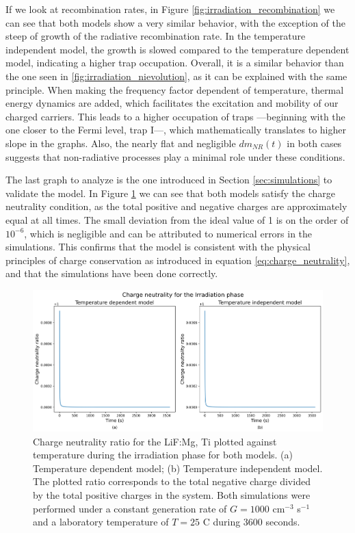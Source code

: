 If we look at recombination rates, in Figure \ref{fig:irradiation_recombination} we can see that both models show a very similar behavior, with the exception of the steep of growth of the radiative recombination rate. In the temperature independent model, the growth is slowed compared to the temperature dependent model, indicating a higher trap occupation. Overall, it is a similar behavior than the one seen in \ref{fig:irradiation_nievolution}, as it can be explained with the same principle. When making the frequency factor dependent of temperature, thermal energy dynamics are added, which facilitates the excitation and mobility of our charged carriers. This leads to a higher occupation of traps ---beginning with the one closer to the Fermi level, trap I---, which mathematically translates to higher slope in the graphs. 
Also, the nearly flat and negligible $dm_{NR}(t)$ in both cases suggests that non-radiative processes play a minimal role under these conditions. %

\vspace{10pt}

The last graph to analyze is the one introduced in Section \ref{sec:simulations} to validate the model. In Figure \ref{fig:irradiation_chneutrality} we can see that both models satisfy the charge neutrality condition, as the total positive and negative charges are approximately equal at all times. The small deviation from the ideal value of 1 is on the order of $10^{-6}$, which is negligible and can be attributed to numerical errors in the simulations. This confirms that the model is consistent with the physical principles of charge conservation as introduced in equation \ref{eq:charge_neutrality}, and that the simulations have been done correctly.

\begin{figure}
    \centering
    \includegraphics[width=\textwidth]{Images/Irradiation Charge neutrality.png}
    \caption{Charge neutrality ratio for the LiF:Mg, Ti plotted against temperature during the irradiation phase for both models. (a) Temperature dependent model; (b) Temperature independent model. The plotted ratio corresponds to the total negative charge divided by the total positive charges in the system. Both simulations were performed under a constant generation rate of $G = 1000$ cm$^{-3}$ s$^{-1}$ and a laboratory temperature of $T = 25$ \textdegree C during 3600 seconds.}
    \label{fig:irradiation_chneutrality}
\end{figure}

